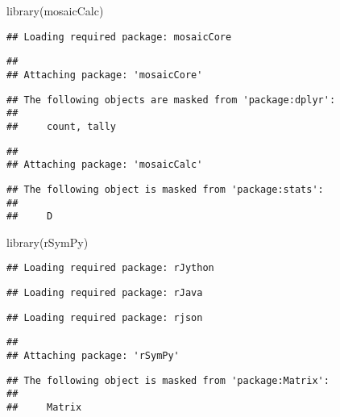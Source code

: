 \documentclass[
]{article}
\newenvironment{Shaded}{\begin{snugshade}}{\end{snugshade}}
\newcommand{\FunctionTok}[1]{\textcolor[rgb]{0.00,0.00,0.00}{#1}}
\newcommand{\NormalTok}[1]{#1}
\begin{document}
\begin{Shaded}
\begin{Highlighting}[]
\FunctionTok{library}\NormalTok{(mosaicCalc)}
\end{Highlighting}
\end{Shaded}

\begin{verbatim}
## Loading required package: mosaicCore
\end{verbatim}

\begin{verbatim}
## 
## Attaching package: 'mosaicCore'
\end{verbatim}

\begin{verbatim}
## The following objects are masked from 'package:dplyr':
## 
##     count, tally
\end{verbatim}

\begin{verbatim}
## 
## Attaching package: 'mosaicCalc'
\end{verbatim}

\begin{verbatim}
## The following object is masked from 'package:stats':
## 
##     D
\end{verbatim}

\begin{Shaded}
\begin{Highlighting}[]
\FunctionTok{library}\NormalTok{(rSymPy)}
\end{Highlighting}
\end{Shaded}

\begin{verbatim}
## Loading required package: rJython
\end{verbatim}

\begin{verbatim}
## Loading required package: rJava
\end{verbatim}

\begin{verbatim}
## Loading required package: rjson
\end{verbatim}

\begin{verbatim}
## 
## Attaching package: 'rSymPy'
\end{verbatim}

\begin{verbatim}
## The following object is masked from 'package:Matrix':
## 
##     Matrix
\end{verbatim}
\end{document}
